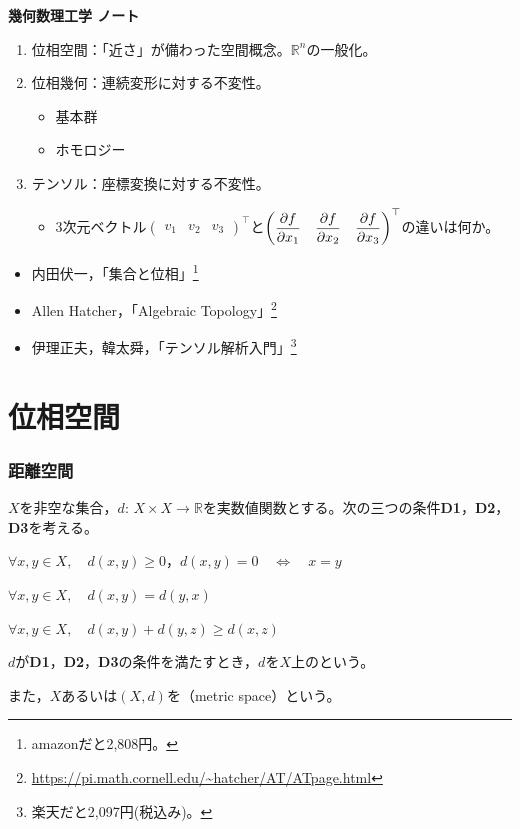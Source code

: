 \documentclass[uplatex]{jsarticle}
\newcommand{\octopuspart}[1]{\newpage\part{#1}\setcounter{section}{0}\vspace{3\baselineskip}}
\begin{document}
\begin{center}{\LARGE \bf 幾何数理工学 ノート}\end{center}

\begin{enumerate}
    \item 位相空間：「近さ」が備わった空間概念。$\mathbb{R}^{n}$の一般化。
    \item 位相幾何：連続変形に対する不変性。
    \begin{itemize}
        \item 基本群
        \item ホモロジー
    \end{itemize}
    \item テンソル：座標変換に対する不変性。
    \begin{itemize}
        \item 3次元ベクトル${\displaystyle \begin{pmatrix}
            v_{1} & v_{2} & v_{3} 
        \end{pmatrix}^{\top}}$と${\displaystyle \begin{pmatrix}
            \dfrac{\partial f}{\partial x_{1}} & \dfrac{\partial f}{\partial x_{2}} & \dfrac{\partial f}{\partial x_{3}}
        \end{pmatrix}^{\top}}$の違いは何か。
    \end{itemize}
\end{enumerate}

\begin{itemize}
    \item 内田伏一，「集合と位相」\footnote{amazonだと2,808円。}
    \item Allen Hatcher，「Algebraic Topology」\footnote{\url{https://pi.math.cornell.edu/~hatcher/AT/ATpage.html}}
    \item 伊理正夫，韓太舜，「テンソル解析入門」\footnote{楽天だと2,097円(税込み)。}
\end{itemize}

\renewcommand{\baselinestretch}{0.1}
\tableofcontents
\renewcommand{\baselinestretch}{1.0}

\octopuspart{位相空間}
\section{距離空間}

\begin{teigi}
    $X$を非空な集合，$d: \, X \times X \to \mathbb{R}$を実数値関数とする。次の三つの条件{\bf D1}，{\bf D2}，{\bf D3}を考える。
    
     $\forall x, y \in X, \quad d(x,y) \ge 0$，\qquad $d(x,y) = 0 \quad \Longleftrightarrow \quad x = y$
    
     $\forall x, y \in X, \quad d(x,y) = d(y,x)$
    
     $\forall x, y \in X, \quad d(x,y) + d(y,z) \ge d(x,z)$
    
    $d$が{\bf D1}，{\bf D2}，{\bf D3}の条件を満たすとき，$d$を$X$上のという。

    また，$X$あるいは$(X,d)$を（metric space）という。
\end{teigi}
\end{document}
